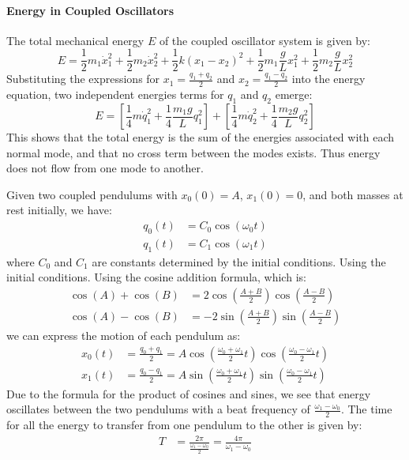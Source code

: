\documentclass[11pt]{report}
\begin{document}
\paragraph{Energy in Coupled Oscillators} The total mechanical energy \( E \) of the coupled oscillator system is given by:
\begin{equation}
    E = \frac{1}{2}m_1\dot{x}_1^2 + \frac{1}{2}m_2\dot{x}_2^2 + \frac{1}{2}k(x_1 - x_2)^2 + \frac{1}{2}m_1\frac{g}{L}x_1^2 + \frac{1}{2}m_2\frac{g}{L}x_2^2
\end{equation}
Substituting the expressions for \( x_1 = \frac{q_1 + q_2}{2} \) and \( x_2 = \frac{q_1 - q_2}{2} \) into the energy equation, two independent energies terms for $q_1$ and $q_2$ emerge:
\begin{equation}
    E = \left[ \frac{1}{4} m \dot{q}_1^2 + \frac{1}{4}\frac{m_1 g}{L} q_1^2 \right] + \left[ \frac{1}{4} m \dot{q}_2^2 + \frac{1}{4}\frac{m_2 g}{L} q_2^2 \right]
\end{equation}
This shows that the total energy is the sum of the energies associated with each normal mode, and that no cross term between the modes exists. Thus energy does not flow from one mode to another.

\begin{example}
    Given two coupled pendulums with $x_0(0) = A$, $x_1(0) = 0$, and both masses at rest initially, we have:
    \begin{align*}
        q_0(t) &= C_0 \cos(\omega_0 t) \\
        q_1(t) &= C_1 \cos(\omega_1 t)
    \end{align*}
    where \( C_0 \) and \( C_1 \) are constants determined by the initial conditions. Using the initial conditions. Using the cosine addition formula, which is:
    \begin{align*}
        \cos(A) + \cos(B) &= 2\cos\left(\frac{A+B}{2}\right)\cos\left(\frac{A-B}{2}\right) \\
        \cos(A) - \cos(B) &= -2\sin\left(\frac{A+B}{2}\right)\sin\left(\frac{A-B}{2}\right)
    \end{align*}
    we can express the motion of each pendulum as:
    \begin{align*}
        x_0(t) &= \frac{q_0 + q_1}{2} = A \cos\left(\frac{\omega_0 + \omega_1}{2} t\right) \cos\left(\frac{\omega_0 - \omega_1}{2} t\right) \\
        x_1(t) &= \frac{q_0 - q_1}{2} = A \sin\left(\frac{\omega_0 + \omega_1}{2} t\right) \sin\left(\frac{\omega_0 - \omega_1}{2} t\right)
    \end{align*}
    Due to the formula for the product of cosines and sines, we see that energy oscillates between the two pendulums with a beat frequency of \( \frac{\omega_1 - \omega_0}{2} \). The time for all the energy to transfer from one pendulum to the other is given by:
    \begin{align*}
        T &= \frac{2\pi}{\frac{\omega_1 - \omega_0}{2}} = \frac{4\pi}{\omega_1 - \omega_0}
    \end{align*}

\end{example}
\end{document}
